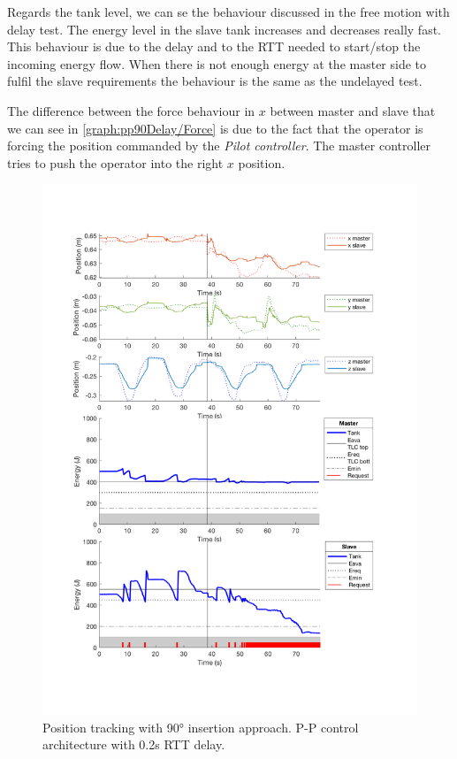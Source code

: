 Regards the tank level, we can se the behaviour discussed in the free motion with delay test.
The energy level in the slave tank increases and decreases really fast. This behaviour is due to the delay and to the RTT needed to start/stop the incoming energy flow.
When there is not enough energy at the master side to fulfil the slave requirements the behaviour is the same as the undelayed test.

The difference between the force behaviour in $x$ between master and slave that we can see in \figurename{ \ref{graph:pp90Delay/Force}}  is due to the fact that the operator is forcing the position commanded by the \textit{Pilot controller}. The master controller tries to push the operator into the right $x$ position.
\begin{center}
	\begin{figure}
		\includegraphics[width=\textwidth, keepaspectratio]{plots/pp90Delay/Position.pdf}
		\caption{Position tracking with 90° insertion approach. P-P control architecture with 0.2s RTT delay.}
		\label{graph:pp90Delay/Position}
	\end{figure}
\end{center}

